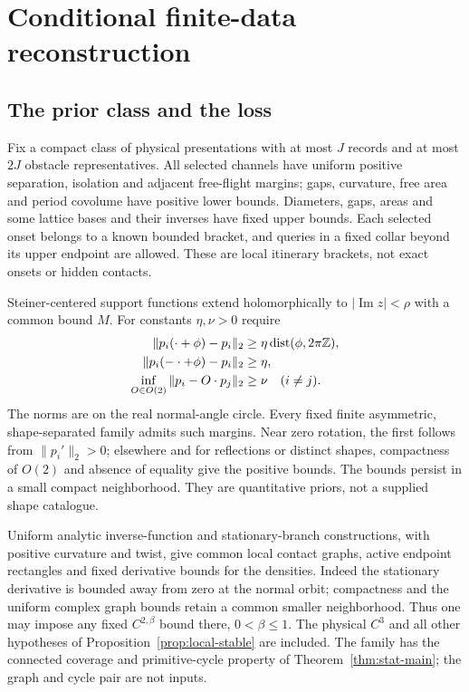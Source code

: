 \section{Conditional finite-data reconstruction}\label{sec:stability}
\subsection{The prior class and the loss}
Fix a compact class of physical presentations with at most $J$ records
and at most $2J$ obstacle representatives. All selected channels have
uniform positive separation, isolation and adjacent free-flight margins;
gaps, curvature, free area and period covolume have positive lower bounds.
Diameters, gaps, areas and some lattice bases and their inverses have
fixed upper bounds. Each selected onset belongs to a known bounded bracket,
and queries in a fixed collar beyond its upper endpoint are allowed.
These are local itinerary brackets, not exact onsets or hidden contacts.

Steiner-centered support functions extend holomorphically to
$|\operatorname{Im}z|<\rho$ with a common bound $M$. For constants
$\eta,\nu>0$ require
\begin{align}
 \|p_i(\cdot+\phi)-p_i\|_2
   &\ge\eta\operatorname{dist}(\phi,2\pi\mathbb Z),                 \label{eq:rot-margin}\\
 \|p_i(-\cdot+\phi)-p_i\|_2&\ge\eta,         \label{eq:ref-margin}\\
 \inf_{O\in O(2)}\|p_i-O\cdot p_j\|_2&\ge\nu\quad(i\ne j).
                                                        \label{eq:shape-margin}
\end{align}
The norms are on the real normal-angle circle. Every fixed finite
asymmetric, shape-separated family admits such margins. Near zero rotation,
the first follows from $\|p_i'\|_2>0$; elsewhere and for reflections or
distinct shapes, compactness of $O(2)$ and absence of equality give the
positive bounds. The bounds persist in a small compact neighborhood.
They are quantitative priors, not a supplied shape catalogue.

Uniform analytic inverse-function and stationary-branch constructions,
with positive curvature and twist, give common local contact graphs,
active endpoint rectangles and fixed derivative bounds for the densities.
Indeed the stationary derivative is bounded away from zero at the normal
orbit; compactness and the uniform complex graph bounds retain a common
smaller neighborhood. Thus one may impose any fixed
$C^{2,\beta}$ bound there, $0<\beta\le1$. The physical $C^3$ and all
other hypotheses of Proposition~\ref{prop:local-stable} are included.
The family has the connected coverage and primitive-cycle property of
Theorem~\ref{thm:stat-main}; the graph and cycle pair are not inputs.

